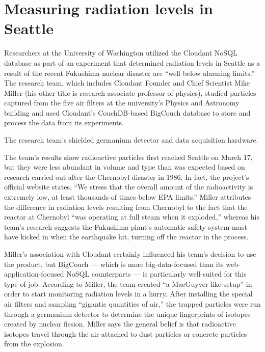 

\section{Measuring radiation levels in Seattle}



Researchers at the University of Washington utilized the Cloudant NoSQL database as part of an experiment that determined radiation levels in Seattle as a result of the recent Fukushima nuclear disaster are “well below alarming limits.” The research team, which includes Cloudant Founder and Chief Scientist Mike Miller (his other title is research associate professor of physics), studied particles captured from the five air filters at the university’s Physics and Astronomy building and used Cloudant’s CouchDB-based BigCouch database to store and process the data from its experiments.

The research team's shielded germanium detector and data acquisition hardware.

The team’s results show radioactive particles first reached Seattle on March 17, but they were less abundant in volume and type than was expected based on research carried out after the Chernobyl disaster in 1986. In fact, the project’s official website states, “We stress that the overall amount of the radioactivity is extremely low, at least thousands of times below EPA limits.” Miller attributes the difference in radiation levels resulting from Chernobyl to the fact that the reactor at Chernobyl “was operating at full steam when it exploded,” whereas his team’s research suggests the Fukushima plant’s automatic safety system must have kicked in when the earthquake hit, turning off the reactor in the process.

Miller’s association with Cloudant certainly influenced his team’s decision to use the product, but BigCouch — which is more big-data-focused than its web-application-focused NoSQL counterparts — is particularly well-suited for this type of job. According to Miller, the team created “a MacGuyver-like setup” in order to start monitoring radiation levels in a hurry. After installing the special air filters and sampling “gigantic quantities of air,” the trapped particles were run through a germanium detector to determine the unique fingerprints of isotopes created by nuclear fission. Miller says the general belief is that radioactive isotopes travel through the air attached to dust particles or concrete particles from the explosion.

